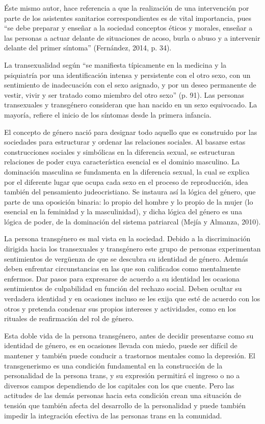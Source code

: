 Éste mismo autor, hace referencia a que la realización de una intervención por
parte de los asistentes sanitarios correspondientes es de vital importancia,
pues “se debe preparar y enseñar a la sociedad conceptos éticos y morales,
enseñar a las personas a actuar delante de situaciones de acoso, burla o abuso y
a intervenir delante del primer síntoma” (Fernández, 2014, p. 34).

La transexualidad según \textcite{GomezGil2006} “se manifiesta típicamente en la
medicina y la psiquiatría por una identificación intensa y persistente con el
otro sexo, con un sentimiento de inadecuación con el sexo asignado, y por un
deseo permanente de vestir, vivir y ser tratado como miembro del otro sexo” (p.
91). Las personas transexuales y transgénero consideran que han nacido en un
sexo equivocado. La mayoría, refiere el inicio de los síntomas desde la primera
infancia.

El concepto de género nació para designar todo aquello que es construido por las
sociedades para estructurar y ordenar las relaciones sociales. Al basarse estas
construcciones sociales y simbólicas en la diferencia sexual, se estructuran
relaciones de poder cuya característica esencial es el dominio masculino. La
dominación masculina se fundamenta en la diferencia sexual, la cual se explica
por el diferente lugar que ocupa cada sexo en el proceso de reproducción, idea
también del pensamiento judeocristiano. Se instaura así la lógica del género,
que parte de una oposición binaria: lo propio del hombre y lo propio de la mujer
(lo esencial en la feminidad y la masculinidad), y dicha lógica del género es
una lógica de poder, de la dominación del sistema patriarcal (Mejía y Almanza,
2010).

La persona transgénero es mal vista en la sociedad. Debido a la discriminación
dirigida hacia los transexuales y transgénero este grupo de personas
experimentan sentimientos de vergüenza de que se descubra su identidad de
género. Además deben enfrentar circunstancias en las que son calificados como
mentalmente enfermos. Dar pasos para expresarse de acuerdo a su identidad les
ocasiona sentimientos de culpabilidad en función del rechazo social. Deben
ocultar su verdadera identidad y en ocasiones incluso se les exija que esté de
acuerdo con los otros y pretenda condenar sus propios intereses y actividades,
como en los rituales de reafirmación del rol de género.

Esta doble vida de la persona transgénero, antes de decidir presentarse como su
identidad de género, es en ocasiones llevada con miedo, puede ser difícil de
mantener y también puede conducir a trastornos mentales como la depresión. El
transgenerismo es una condición fundamental en la construcción de la
personalidad de la persona trans, y su expresión permitirá el ingreso o no a
diversos campos dependiendo de los capitales con los que cuente. Pero las
actitudes de las demás personas hacia esta condición crean una situación de
tensión que también afecta del desarrollo de la personalidad y puede también
impedir la integración efectiva de las personas trans en la comunidad.

